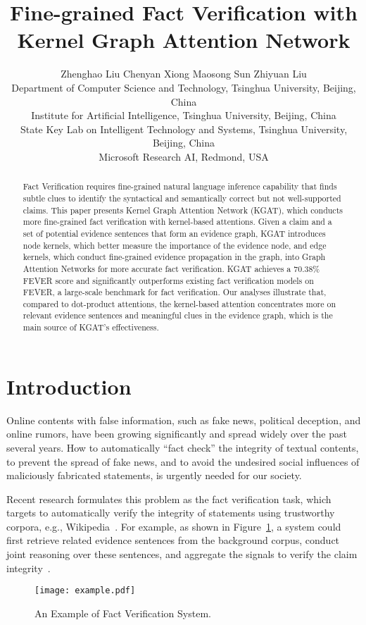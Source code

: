 \documentclass[11pt,a4paper]{article}
\title{Fine-grained Fact Verification with Kernel Graph Attention Network}
\author{Zhenghao Liu \qquad Chenyan Xiong \qquad Maosong Sun \qquad Zhiyuan Liu \\ 
Department of Computer Science and Technology, Tsinghua University, Beijing, China\\
Institute for Artificial Intelligence, Tsinghua University, Beijing, China\\
State Key Lab on Intelligent Technology and Systems, Tsinghua University, Beijing, China\\
Microsoft Research AI,  Redmond, USA\\}
\date{}
\begin{document}
\maketitle
\begin{abstract}
	Fact Verification requires fine-grained natural language inference capability that finds subtle clues to identify the syntactical and semantically correct but not well-supported claims. This paper presents Kernel Graph Attention Network (KGAT), which conducts more fine-grained fact verification with kernel-based attentions. Given a claim and a set of potential evidence sentences that form an evidence graph, KGAT introduces node kernels, which better measure the importance of the evidence node, and edge kernels, which conduct fine-grained evidence propagation in the graph, into Graph Attention Networks for more accurate fact verification. KGAT achieves a 70.38\% FEVER score and significantly outperforms existing fact verification models on FEVER, a large-scale benchmark for fact verification. Our analyses illustrate that, compared to dot-product attentions, the kernel-based attention concentrates more on relevant evidence sentences and meaningful clues in the evidence graph, which is the main source of KGAT's effectiveness.
\end{abstract}
\section{Introduction}
Online contents with false information, such as fake news, political deception, and online rumors, have been growing significantly and spread widely over the past several years.
How to automatically ``fact check'' the integrity of textual contents, to prevent the spread of fake news, and to avoid the undesired social influences of maliciously fabricated statements, is urgently needed for our society.

Recent research formulates this problem as the fact verification task, which targets to automatically verify the integrity of statements using trustworthy corpora, e.g., Wikipedia~\cite{thorne2018fever}.
For example, as shown in Figure~\ref{fig:example}, a system could first retrieve related evidence sentences from the background corpus, conduct joint reasoning over these sentences, and aggregate the signals to verify the claim integrity~\cite{nie2019combining,zhou2019gear,yoneda2018ucl,hanselowski2018ukp}.
\begin{figure}[t]
	\centering
	\texttt{[image: example.pdf]}
	\caption{An Example of Fact Verification System.}
	\label{fig:example}
\end{figure}
\end{document}

